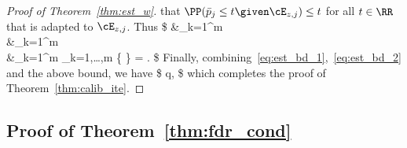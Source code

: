 \begin{proof}[Proof of Theorem~\ref{thm:est_w}]
that $\PP(\bar p_j \leq t\given \cE_{z,j})\leq t$ for
all $t\in \RR$ that is adapted to $\cE_{z,j}$. Thus
\$
&\sum_{k=1}^m \EE\Bigg[ \frac{\ind\{ |\tilde\cR_{j\to 0}|=k \}}{k} \cdot \PP\Big(   \tilde{p}_j \leq \frac{q k}{m}   \Biggiven \cE_{z,j}\Big) \Bigg] \\
&\leq \sum_{k=1}^m \EE\Bigg[ \frac{\ind\{ |\tilde\cR_{j\to 0}|=k \}}{k} \cdot \PP\Big(   \bar{p}_j \leq \frac{\hat\gamma^2 }{\hat\gamma^2  + \frac{m}{qk}-1 }  \Biggiven \cE_{z,j}\Big) \Bigg] \\
&\leq \sum_{k=1}^m \EE\Bigg[ \frac{\ind\{ |\tilde\cR_{j\to 0}|=k \}}{k} \cdot   \frac{\hat\gamma^2 }{\hat\gamma^2  + \frac{m}{qk}-1 }   \Bigg]
\leq \max_{k=1,\dots,m} \bigg\{    \bigg\} =  \cdot {}.
\$
Finally, combining~\eqref{eq:est_bd_1},~\eqref{eq:est_bd_2}
and the above bound, we have
\$
\fdr\leq q\cdot \EE{},
\$
which completes the proof
of Theorem~\ref{thm:calib_ite}.
\end{proof}


\subsection{Proof of Theorem~\ref{thm:fdr_cond}}
\label{app:thm_outlier}


